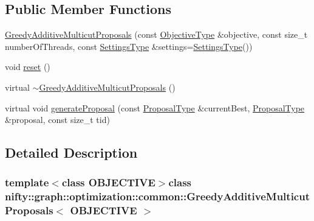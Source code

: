 \subsection*{Public Member Functions}
\begin{DoxyCompactItemize}
\item 
\hyperlink{classnifty_1_1graph_1_1optimization_1_1common_1_1GreedyAdditiveMulticutProposals_a3b4ee55a1e07d1ce8b48e1530f94f009}{Greedy\+Additive\+Multicut\+Proposals} (const \hyperlink{classnifty_1_1graph_1_1optimization_1_1common_1_1GreedyAdditiveMulticutProposals_a82ebea313ce98149a4ac7003b792d6fe}{Objective\+Type} \&objective, const size\+\_\+t number\+Of\+Threads, const \hyperlink{structnifty_1_1graph_1_1optimization_1_1common_1_1GreedyAdditiveMulticutProposals_1_1SettingsType}{Settings\+Type} \&settings=\hyperlink{structnifty_1_1graph_1_1optimization_1_1common_1_1GreedyAdditiveMulticutProposals_1_1SettingsType}{Settings\+Type}())
\item 
void \hyperlink{classnifty_1_1graph_1_1optimization_1_1common_1_1GreedyAdditiveMulticutProposals_ac2882a1bc7965030f8e477be1f4e427f}{reset} ()
\item 
virtual \hyperlink{classnifty_1_1graph_1_1optimization_1_1common_1_1GreedyAdditiveMulticutProposals_a4b1dbdc649ea98864bca984afd3a1c8a}{$\sim$\+Greedy\+Additive\+Multicut\+Proposals} ()
\item 
virtual void \hyperlink{classnifty_1_1graph_1_1optimization_1_1common_1_1GreedyAdditiveMulticutProposals_a61254ea7da2ebb0da33c545449951ada}{generate\+Proposal} (const \hyperlink{classnifty_1_1graph_1_1optimization_1_1common_1_1GreedyAdditiveMulticutProposals_a2344bbd2084e7c62a179e6f0ce2d11f8}{Proposal\+Type} \&current\+Best, \hyperlink{classnifty_1_1graph_1_1optimization_1_1common_1_1GreedyAdditiveMulticutProposals_a2344bbd2084e7c62a179e6f0ce2d11f8}{Proposal\+Type} \&proposal, const size\+\_\+t tid)
\end{DoxyCompactItemize}


\subsection{Detailed Description}
\subsubsection*{template$<$class O\+B\+J\+E\+C\+T\+I\+V\+E$>$class nifty\+::graph\+::optimization\+::common\+::\+Greedy\+Additive\+Multicut\+Proposals$<$ O\+B\+J\+E\+C\+T\+I\+V\+E $>$}


